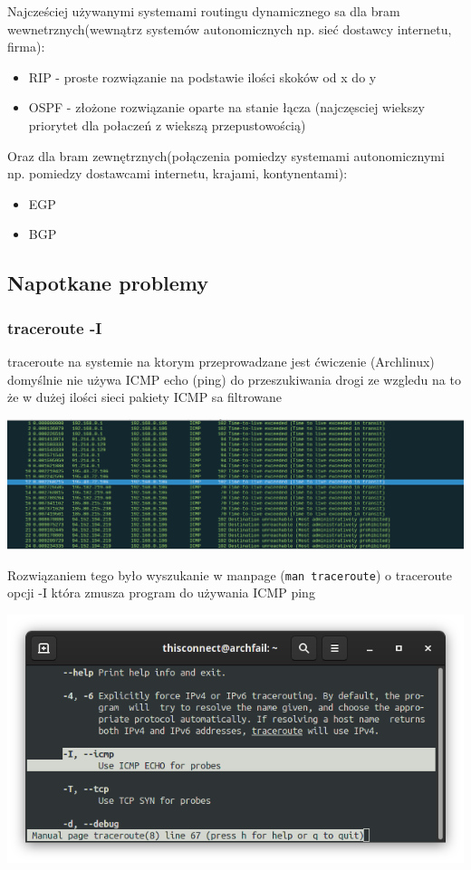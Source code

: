 \documentclass[11pt]{article}
\begin{document}
Najcześciej używanymi systemami routingu dynamicznego sa dla bram wewnetrznych(wewnątrz systemów autonomicznych np. sieć dostawcy internetu, firma):
\begin{itemize}
\item RIP - proste rozwiązanie na podstawie ilości skoków od x do y
\end{itemize}
\begin{itemize}
\item OSPF - złożone rozwiązanie oparte na stanie łącza (najczęsciej wiekszy priorytet dla połaczeń z wiekszą przepustowością)
\end{itemize}
Oraz dla bram zewnętrznych(połączenia pomiedzy systemami autonomicznymi np. pomiedzy dostawcami internetu, krajami, kontynentami):
\begin{itemize}
\item EGP
\item BGP
\end{itemize}

\subsection{Napotkane problemy}
\label{sec:org5bc164b}
\subsubsection{traceroute -I}
\label{sec:org78b39fb}
traceroute na systemie na ktorym przeprowadzane jest ćwiczenie (Archlinux) domyślnie nie używa ICMP echo (ping) do przeszukiwania drogi ze wzgledu na to że w dużej ilości sieci pakiety ICMP sa filtrowane
\begin{center}
\includegraphics[width=.9\linewidth]{./problemy/problem1.png}
\end{center}

Rozwiązaniem tego było wyszukanie w manpage (\texttt{man traceroute}) o traceroute opcji -I która zmusza program do używania ICMP ping
\begin{center}
\includegraphics[width=.9\linewidth]{./problemy/rozwiazanie1.png}
\end{center}
\end{document}
